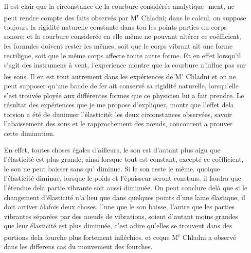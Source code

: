 \documentclass[11pt,a4paper]{article}
\begin{document}
Il est clair que la circonstance de la courbure considérée analytique-
ment, ne peut rendre compte des faits observés par M\textsuperscript{r} Chladni;
   dans  le calcul, on suppose
toujours la rigidité naturelle constante dans tou les points
parties du corps sonore; et la courbure considerée en elle même
ne pouvant altérer ce coëfficient, les formules doivent rester les
mêmes, soit que le corps vibrant  ait une forme rectiligne,
soit que le même corps affecte toute autre forme. Et en
effet lorsqu'il s'agit des instrumens à vent, l'experience
montre que la courbure n'influe pas sur les sons.
Il en est tout autrement dans les expériences de M\textsuperscript{r} Chladni
et on ne peut supposer qu'une bande de fer ait conservé
sa rigidité naturelle, lorsqu'elle s'est trouvée ployée aux
différentes formes que ce physicien lui a fait prendre.
Le résultat des expériences que je me propose d'expliquer,
montr que l'effet dela torsion a été de diminuer
l'élasticité;  les deux circonstances observées, savoir l'abaissement
des sons et le rapprochement des nœuds, concourent  a prouver cette diminution.


En effet, toutes choses égales d'ailleurs, le son est d'autant plus aigu
que l'élasticité est plus grande; ainsi lorsque tout est constant,
excepté ce coëfficient, le son ne peut baisser sans qu'  diminue.
Si le son reste le même, quoique l'élasticité diminue, 
lorsque le poids et l'épaisseur seront constans, il faudra
que l'étendue dela partie vibrante soit aussi diminuée.
On peut conclure delà que si le changement d'élasticité
n'a lieu que dans quelques points d'une lame élastique, il
doit arriver àlafois deux choses, l'une que le son baisse,
l'autre que les parties vibrantes séparées par des nœuds
de vibrations, soient d'autant moins grandes que leur élasticité
est plus diminuée, c'est adire qu'elles se trouvent dans des
portions dela fourche plus fortement infléchies. et
  ceque M\textsuperscript{r}
Chladni a observé dans les differens cas du mouvement
des fourches.
\end{document}
